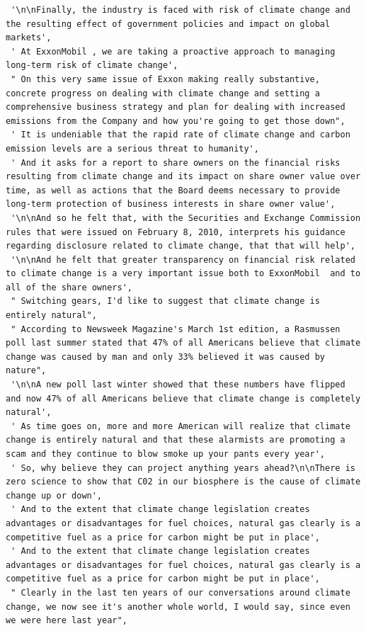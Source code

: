 \documentclass[
  letterpaper,
  DIV=11,
  numbers=noendperiod]{scrreprt}
\begin{document}
\begin{verbatim}
 '\n\nFinally, the industry is faced with risk of climate change and the resulting effect of government policies and impact on global markets',
 ' At ExxonMobil , we are taking a proactive approach to managing long-term risk of climate change',
 " On this very same issue of Exxon making really substantive, concrete progress on dealing with climate change and setting a comprehensive business strategy and plan for dealing with increased emissions from the Company and how you're going to get those down",
 ' It is undeniable that the rapid rate of climate change and carbon emission levels are a serious threat to humanity',
 ' And it asks for a report to share owners on the financial risks resulting from climate change and its impact on share owner value over time, as well as actions that the Board deems necessary to provide long-term protection of business interests in share owner value',
 '\n\nAnd so he felt that, with the Securities and Exchange Commission rules that were issued on February 8, 2010, interprets his guidance regarding disclosure related to climate change, that that will help',
 '\n\nAnd he felt that greater transparency on financial risk related to climate change is a very important issue both to ExxonMobil  and to all of the share owners',
 " Switching gears, I'd like to suggest that climate change is entirely natural",
 " According to Newsweek Magazine's March 1st edition, a Rasmussen poll last summer stated that 47% of all Americans believe that climate change was caused by man and only 33% believed it was caused by nature",
 '\n\nA new poll last winter showed that these numbers have flipped and now 47% of all Americans believe that climate change is completely natural',
 ' As time goes on, more and more American will realize that climate change is entirely natural and that these alarmists are promoting a scam and they continue to blow smoke up your pants every year',
 ' So, why believe they can project anything years ahead?\n\nThere is zero science to show that C02 in our biosphere is the cause of climate change up or down',
 ' And to the extent that climate change legislation creates advantages or disadvantages for fuel choices, natural gas clearly is a competitive fuel as a price for carbon might be put in place',
 ' And to the extent that climate change legislation creates advantages or disadvantages for fuel choices, natural gas clearly is a competitive fuel as a price for carbon might be put in place',
 " Clearly in the last ten years of our conversations around climate change, we now see it's another whole world, I would say, since even we were here last year",

\end{verbatim}
\end{document}
